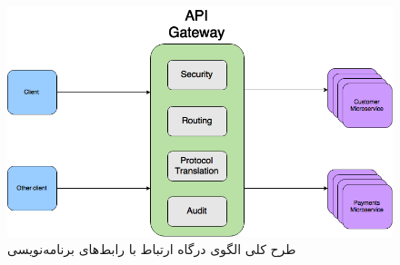 \begin{figure}[H]
    \centering
	\label{apigateway_schema}
	\includegraphics[scale=0.4]{images/AGARC.png}
	\caption{طرح کلی الگوی درگاه ارتباط با رابط‌های برنامه‌نویسی}
\end{figure}

\cleardoublepage 